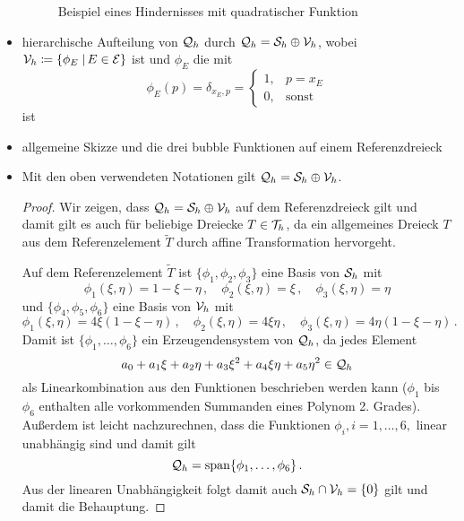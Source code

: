 \begin{itemize}
\begin{bem}
\begin{figure}[h]
\caption{Beispiel eines Hindernisses mit quadratischer Funktion}
\end{figure}
\end{bem}

\item hierarchische Aufteilung von $\mathcal Q_h$ durch $\mathcal Q_h = \mathcal S_h \oplus \mathcal V_h$, wobei $\mathcal V_h \coloneqq \{\phi_E \;\vert\, E \in \mathcal E\}$ ist und $\phi_E$ die \textit{} mit
\[
	\phi_E (p) = \delta_{x_E,p} = \begin{cases}
								1, & p = x_E \\
								0, & \text{sonst}
							\end{cases}
\]
ist

\item
\begin{bsp}
allgemeine Skizze und die drei bubble Funktionen auf einem Referenzdreieck
\end{bsp}

\item
\begin{satz}
Mit den oben verwendeten Notationen gilt $\mathcal Q_h = \mathcal S_h \oplus \mathcal V_h$.
\end{satz}

\begin{proof}
Wir zeigen, dass $\mathcal Q_h = \mathcal S_h \oplus \mathcal V_h$ auf dem Referenzdreieck gilt und damit gilt es auch für beliebige Dreiecke $T \in \mathcal T_h$, da ein allgemeines Dreieck $T$ aus dem Referenzelement $\tilde T$ durch affine Transformation hervorgeht.

Auf dem Referenzelement $\tilde T$ ist $\{\phi_1,\phi_2,\phi_3\}$ eine Basis von $\mathcal S_h$ mit
\[
	\phi_1(\xi,\eta) = 1-\xi-\eta \, , \quad \phi_2(\xi,\eta) = \xi \, , \quad \phi_3(\xi,\eta) = \eta
\]
und $\{\phi_4,\phi_5,\phi_6\}$ eine Basis von $\mathcal V_h$ mit
\[
	\phi_1(\xi,\eta) = 4\xi (1-\xi-\eta) \, , \quad \phi_2(\xi,\eta) = 4\xi\eta \, , \quad \phi_3(\xi,\eta) = 4\eta(1-\xi-\eta) \, .
\]
Damit ist $\{\phi_1,\ldots,\phi_6\}$ ein Erzeugendensystem von $\mathcal Q_h$, da jedes Element
\[
	a_0+a_1\xi+a_2\eta + a_3 \xi^2+ a_4\xi\eta +a_5\eta^2 \in \mathcal Q_h
\]
als Linearkombination aus den Funktionen beschrieben werden kann ($\phi_1$ bis $\phi_6$ enthalten alle vorkommenden Summanden eines Polynom 2. Grades). Außerdem ist leicht nachzurechnen, dass die Funktionen $\phi_i,i = 1,\ldots,6,$ linear unabhängig sind und damit gilt
\[
	\mathcal Q_h = \operatorname{span} \{\phi_1,\ldots,\phi_6\} \, .
\]
Aus der linearen Unabhängigkeit folgt damit auch $\mathcal S_h \cap \mathcal V_h = \{0\}$ gilt und damit die Behauptung.
\end{proof}


\end{itemize}
